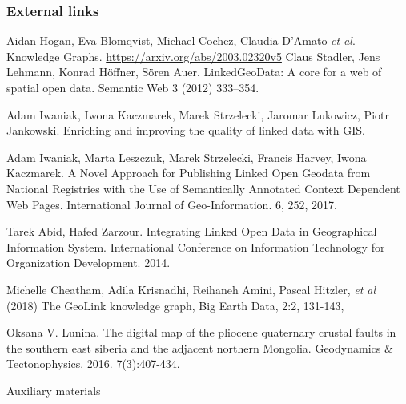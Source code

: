 \documentclass[10pt]{beamer}
\begin{document}
\begin{frame}
  \frametitle{External links}\footnotesize
  \begin{thebibliography}{99}
 Aidan Hogan, Eva Blomqvist, Michael Cochez, Claudia D’Amato \emph{et al}. Knowledge Graphs. \url{https://arxiv.org/abs/2003.02320v5}
 Claus Stadler, Jens Lehmann, Konrad Höffner, Sören Auer. LinkedGeoData: A core for a web of spatial open data. Semantic Web 3 (2012) 333–354. 

 Adam Iwaniak, Iwona Kaczmarek, Marek Strzelecki, Jaromar Lukowicz, Piotr Jankowski. Enriching and improving the quality of linked data with GIS. 

 Adam Iwaniak, Marta Leszczuk, Marek Strzelecki, Francis Harvey, Iwona Kaczmarek. A Novel Approach for Publishing Linked Open Geodata from National Registries with the Use of Semantically Annotated Context Dependent Web Pages. International Journal of Geo-Information. 6, 252, 2017. 

 Tarek Abid, Hafed Zarzour. Integrating Linked Open Data in Geographical
Information System. International Conference on Information Technology for Organization Development. 2014.

 Michelle Cheatham, Adila Krisnadhi, Reihaneh Amini, Pascal Hitzler, \emph{et al} (2018) The GeoLink knowledge graph, Big Earth Data, 2:2, 131-143, 

 Oksana V. Lunina.  The digital map of the pliocene quaternary crustal faults in the southern east siberia and the adjacent northern Mongolia. Geodynamics \& Tectonophysics. 2016. 7(3):407-434. 
\end{thebibliography}
\end{frame}

\begin{frame}
  \begin{center}
  \Large Auxiliary materials
\end{center}
\end{frame}
\end{document}
